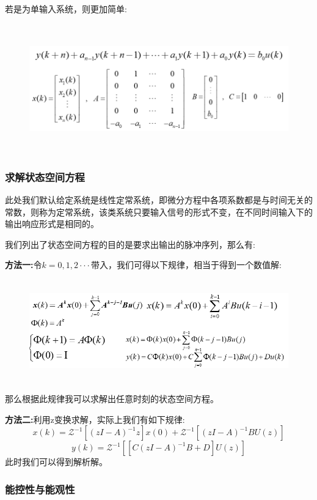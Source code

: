 \documentclass[12pt, a4paper, oneside]{ctexbook}
\begin{document}
若是为单输入系统，则更加简单:
\begin{figure}[htbp]
	\centering
	\includegraphics[width=17cm,height=5.6cm]{img/10_3.png}
\end{figure}

\subsubsection{求解状态空间方程}
此处我们默认给定系统是线性定常系统，即微分方程中各项系数都是与时间无关的常数，则称为定常系统，该类系统只要输入信号的形式不变，在不同时间输入下的输出响应形式是相同的。

我们列出了状态空间方程的目的是要求出输出的脉冲序列，那么有:

\noindent \textbf{方法一:}令$k=0,1,2···$带入，我们可得以下规律，相当于得到一个数值解:

\begin{figure}[htbp]
	\centering
	\includegraphics[width=14cm,height=4.4cm]{img/10_4.png}
\end{figure}
那么根据此规律我可以求解出任意时刻的状态空间方程。

\noindent \textbf{方法二:}利用z变换求解，实际上我们有如下规律:
$$
x(k)=\mathcal Z^{-1}[(zI-A)^{-1}z]x(0)+\mathcal Z^{-1}[(zI-A)^{-1}BU(z)]
$$
$$
y(k)=\mathcal Z^{-1}[[C(zI-A)^{-1}B+D]U(z)]
$$
此时我们可以得到解析解。
\subsubsection{能控性与能观性} 
\end{document}
